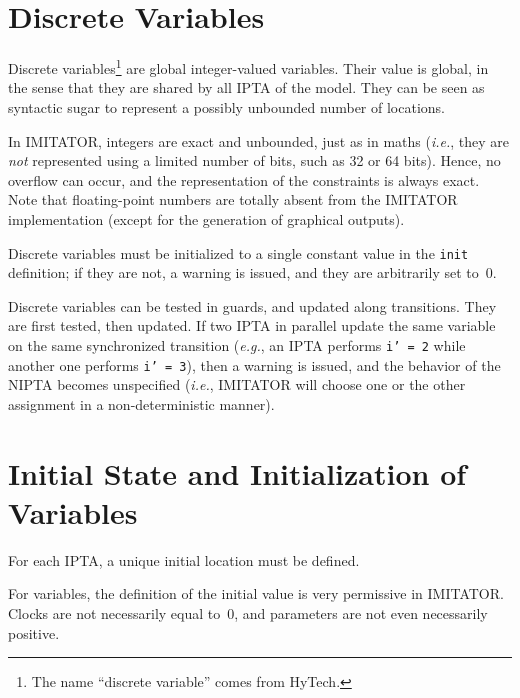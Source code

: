 \documentclass[a4paper,11pt]{report}
\makeatletter
\newcommand{\hytech}{{\sc HyTech}}
\newcommand{\imitator}{\textsf{IMITATOR}}
\newcommand{\IPTA}{IPTA}
\newcommand{\NIPTA}{NIPTA}
\newcommand{\styleIMI}[1]{\textcolor{imicolor}{\texttt{#1}}}
\newcommand{\eg}{\textcolor{colorok}{\textit{e.g.},\@}}
\newcommand{\ie}{\textcolor{colorok}{\textit{i.e.},\@}}
\makeatother
\begin{document}
\section{Discrete Variables}\label{section:discrete}

Discrete variables\footnote{%
	The name ``discrete variable'' comes from \hytech{}.
}
are global integer-valued variables.
Their value is global, in the sense that they are shared by all \IPTA{} of the model.
They can be seen as syntactic sugar to represent a possibly unbounded number of locations.

In \imitator{}, integers are exact and unbounded, just as in maths (\ie{} they are \emph{not} represented using a limited number of bits, such as 32 or 64 bits).
Hence, no overflow can occur, and the representation of the constraints is always exact.
Note that floating-point numbers are totally absent from the \imitator{} implementation (except for the generation of graphical outputs).

Discrete variables must be initialized to a single constant value in the \styleIMI{init} definition;
if they are not, a warning is issued, and they are arbitrarily set to~0.

Discrete variables can be tested in guards, and updated along transitions.
They are first tested, then updated.
If two \IPTA{} in parallel update the same variable on the same synchronized transition (\eg{} an \IPTA{} performs \styleIMI{i' = 2} while another one performs \styleIMI{i' = 3}), then a warning is issued, and the behavior of the \NIPTA{} becomes unspecified (\ie{} \imitator{} will choose one or the other assignment in a non-deterministic manner).



\section{Initial State and Initialization of Variables}\label{section:init}

For each \IPTA{}, a unique initial location must be defined.

For variables, the definition of the initial value is very permissive in \imitator{}.
Clocks are not necessarily equal to~0, and parameters are not even necessarily positive.
\end{document}
